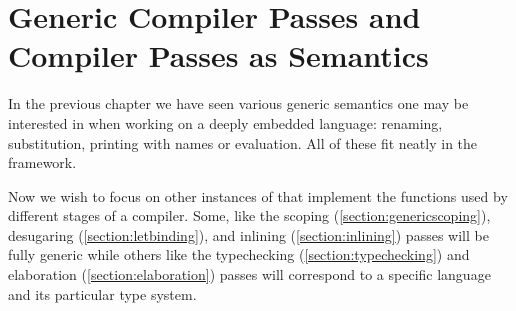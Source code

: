\chapter{Generic Compiler Passes and Compiler Passes as Semantics}

In the previous chapter we have seen various generic semantics one may be
interested in when working on a deeply embedded language: renaming,
substitution, printing with names or evaluation. All of these fit neatly
in the  framework.

Now we wish to focus on other instances of  that implement
the functions used by different stages of a compiler. Some, like the
scoping (\cref{section:genericscoping}), desugaring (\cref{section:letbinding}),
and inlining (\cref{section:inlining}) passes will be fully generic
while others like the typechecking (\cref{section:typechecking}) and
elaboration (\cref{section:elaboration}) passes will correspond to a
specific language and its particular type system.






